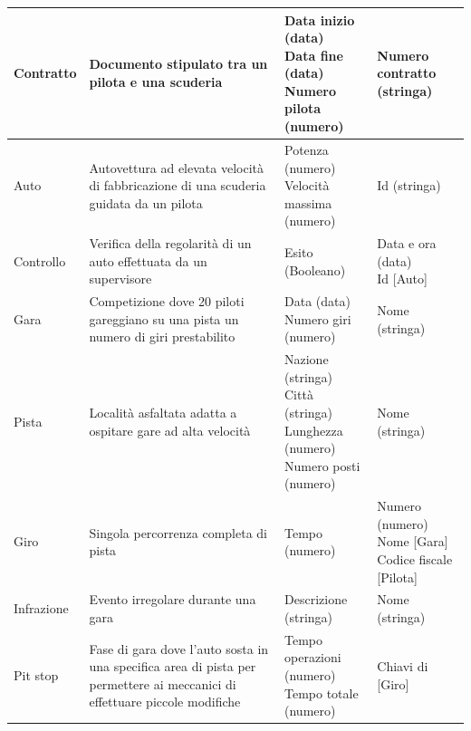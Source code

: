 \documentclass[11pt]{article}
\begin{document}
\begin{center}
{\begin{tabular}{ |l|p{5.5cm}|p{5cm}|p{4cm}| }
        \hline
        Contratto &
        Documento stipulato tra un pilota e una scuderia & 
        \parbox[t]{\linewidth}{Data inizio (data)\\Data fine (data)\\Numero pilota (numero)} & 
        Numero contratto (stringa) \\

        \hline
        Auto &
        Autovettura ad elevata velocità di fabbricazione di una scuderia guidata da un pilota &
        \parbox[t]{\linewidth}{Potenza (numero)\\Velocità massima (numero)} & 
        Id (stringa) \\

        \hline
        Controllo &
        Verifica della regolarità di un auto effettuata da un supervisore & 
        \parbox[t]{\linewidth}{Esito (Booleano)} & 
        \parbox[t]{\linewidth}{Data e ora (data)\\Id [Auto] } \\

        \hline
        Gara &
        Competizione dove 20 piloti gareggiano su una pista un numero di giri prestabilito & 
        \parbox[t]{\linewidth}{Data (data)\\Numero giri (numero)} & 
        Nome (stringa) \\

        \hline
        Pista &
        Località asfaltata adatta a ospitare gare ad alta velocità & 
        \parbox[t]{\linewidth}{Nazione (stringa)\\Città (stringa)\\Lunghezza (numero)\\Numero posti (numero)} & 
        Nome (stringa) \\

        \hline
        Giro &
        Singola percorrenza completa di pista & 
        \parbox[t]{\linewidth}{Tempo (numero)} & 
        \parbox[t]{\linewidth}{Numero (numero)\\Nome [Gara]\\Codice fiscale [Pilota]} \\ 

        \hline
        Infrazione &
        Evento irregolare durante una gara & 
        \parbox[t]{\linewidth}{Descrizione (stringa)} & 
        Nome (stringa) \\

        \hline
        Pit stop &
        Fase di gara dove l'auto sosta in una specifica area di pista per permettere ai meccanici di effettuare piccole modifiche & 
        \parbox[t]{\linewidth}{Tempo operazioni (numero)\\Tempo totale (numero)} & 
        Chiavi di [Giro] \\

        \hline
    \end{tabular}
}
\end{center}
\end{document}
